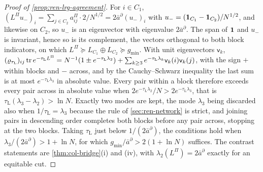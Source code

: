 \begin{proof}[Proof of \cref{prop:ren-lrg-agreement}]
For $i\in C_1$, $(L^\Pi u_-)_i=\sum_{j\in C_2}a^\Pi_{ij}\cdot2/N^{1/2}=2\bar a^\partial(u_-)_i$ with $u_-=(\mathbf{1}_{C_1}-\mathbf{1}_{C_2})/N^{1/2}$, and likewise on $C_2$, so $u_-$ is an eigenvector with eigenvalue $2\bar a^\partial$. The span of $\mathbf{1}$ and $u_-$ is invariant, hence so is its complement, the vectors orthogonal to both block indicators, on which $L^\Pi\succeq L_{C_1}\oplus L_{C_2}\succeq g_{\min}$. With unit eigenvectors $\mathsf v_k$, $(\varrho_{\tau_{\mathrm L}})_{ij}\operatorname{tr} e^{-\tau_{\mathrm L}L^\Pi}=N^{-1}(1\pm e^{-\tau_{\mathrm L}\lambda_2})+\sum_{k\ge3}e^{-\tau_{\mathrm L}\lambda_k}\mathsf v_k(i)\mathsf v_k(j)$, with the sign $+$ within blocks and $-$ across, and by the Cauchy--Schwarz inequality the last sum is at most $e^{-\tau_{\mathrm L}\lambda_3}$ in absolute value. Every pair within a block therefore exceeds every pair across in absolute value when $2e^{-\tau_{\mathrm L}\lambda_2}/N>2e^{-\tau_{\mathrm L}\lambda_3}$, that is $\tau_{\mathrm L}(\lambda_3-\lambda_2)>\ln N$. Exactly two modes are kept, the mode $\lambda_3$ being discarded also when $1/\tau_{\mathrm L}=\lambda_3$ because the rule of \cref{sec:ren-network} is strict, and joining pairs in descending order completes both blocks before any pair across, stopping at the two blocks. Taking $\tau_{\mathrm L}$ just below $1/(2\bar a^\partial)$, the conditions hold when $\lambda_3/(2\bar a^\partial)>1+\ln N$, for which $g_{\min}/\bar a^\partial>2(1+\ln N)$ suffices. The contrast statements are \cref{thm:col-bridge}(i) and (iv), with $\lambda_2(L^\Pi)=2\bar a^\partial$ exactly for an equitable cut.
\end{proof}

